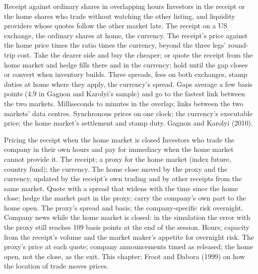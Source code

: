 \begin{strategyfile}{Receipt against ordinary shares in overlapping hours}\label{strat:hf:depositary-receipts-and-dual-listings:overlap}
 Investors in the receipt or the home shares who trade without watching the other listing, and liquidity providers
whose quotes follow the other market late.
 The receipt on a US exchange, the ordinary shares at home, the currency.
 The receipt's price against the home price times the ratio times the currency, beyond the three legs' round-trip cost.
 Take the dearer side and buy the cheaper; or quote the receipt from the home market and hedge fills there and in the
currency; hold until the gap closes or convert when inventory builds.
 Three spreads, fees on both exchanges, stamp duties at home where they apply, the currency's spread.
 Gaps average a few basis points (4.9 in Gagnon and Karolyi's sample) and go to the fastest link between the two markets.
 Milliseconds to minutes in the overlap; links between the two markets' data centres.
 Synchronous prices on one clock; the currency's executable price; the home market's settlement and stamp duty.
 Gagnon and Karolyi (2010).
\end{strategyfile}

\begin{strategyfile}{Pricing the receipt when the home market is closed}\label{strat:hf:depositary-receipts-and-dual-listings:closed}
 Investors who trade the company in their own hours and pay for immediacy when the home market cannot provide it.
 The receipt; a proxy for the home market (index future, country fund); the currency.
 The home close moved by the proxy and the currency, updated by the receipt's own trading and by other receipts from the same market.
 Quote with a spread that widens with the time since the home close; hedge the market part in the proxy; carry the
company's own part to the home open.
 The proxy's spread and basis; the company-specific risk overnight.
 Company news while the home market is closed: in the simulation the error with the proxy still reaches 109 basis points at the
end of the session.
 Hours; capacity from the receipt's volume and the market maker's appetite for overnight risk.
 The proxy's price at each quote; company announcements timed as released; the home open, not the close, as the exit.
 This chapter; Froot and Dabora (1999) on how the location of trade moves prices.
\end{strategyfile}


